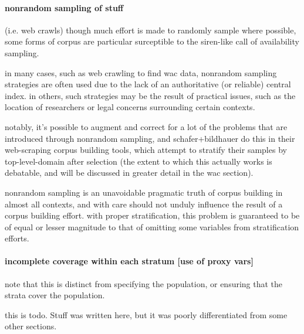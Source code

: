 \paragraph{ nonrandom sampling of stuff }
(i.e. web crawls)
though much effort is made to randomly sample where possible, some forms of corpus are particular surceptible to the siren-like call of availability sampling.

in many cases, such as web crawling to find wac data, nonrandom sampling strategies are often used due to the lack of an authoritative (or reliable) central index.  in others, such strategies may be the result of practical issues, such as the location of researchers or legal concerns surrounding certain contexts.

notably, it's possible to augment and correct for a lot of the problems that are introduced through nonrandom sampling, and schafer+bildhauer do this in their web-scraping corpus building tools, which attempt to stratify their samples by top-level-domain after selection (the extent to which this actually works is debatable, and will be discussed in greater detail in the wac section).

nonrandom sampling is an unavoidable pragmatic truth of corpus building in almost all contexts, and with care should not unduly influence the result of a corpus building effort.  with proper stratification, this problem is guaranteed to be of equal or lesser magnitude to that of omitting some variables from stratification efforts.



\paragraph{ incomplete coverage within each stratum [use of proxy vars]}
note that this is distinct from specifying the population, or ensuring that the strata cover the population.

this is todo.  Stuff was written here, but it was poorly differentiated from some other sections.










